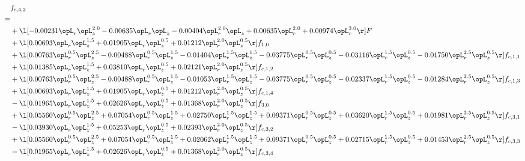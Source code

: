 \begin{alignat}{2} 
\label{eq:f_42_1} 
& f_{c,4,2} \nonumber \\ 
 = \\ 
& + \l[  -0.00231 \opL_r \opL_z^{2.0}   -0.00635 \opL_r \opL_z   -0.00404 \opL_r^{2.0} \opL_z +  0.00635 \opL_r^{2.0} +  0.00974 \opL_r^{3.0}  \r] F \nonumber \\ 
& + \l[  0.00693 \opL_r \opL_z^{1.5} +  0.01905 \opL_r \opL_z^{0.5} +  0.01212 \opL_r^{2.0} \opL_z^{0.5}  \r] f_{1,0} \nonumber \\ 
& + \l[  0.00763 \opL_r^{0.5} \opL_z^{2.5}   -0.00488 \opL_r^{0.5} \opL_z^{1.5}   -0.01404 \opL_r^{1.5} \opL_z^{1.5}   -0.03775 \opL_r^{0.5} \opL_z^{0.5}   -0.03116 \opL_r^{1.5} \opL_z^{0.5}   -0.01750 \opL_r^{2.5} \opL_z^{0.5}  \r] f_{c,1,1} \nonumber \\ 
& + \l[  0.01385 \opL_r \opL_z^{1.5} +  0.03810 \opL_r \opL_z^{0.5} +  0.02121 \opL_r^{2.0} \opL_z^{0.5}  \r] f_{c,1,2} \nonumber \\ 
& + \l[  0.00763 \opL_r^{0.5} \opL_z^{2.5}   -0.00488 \opL_r^{0.5} \opL_z^{1.5}   -0.01053 \opL_r^{1.5} \opL_z^{1.5}   -0.03775 \opL_r^{0.5} \opL_z^{0.5}   -0.02337 \opL_r^{1.5} \opL_z^{0.5}   -0.01284 \opL_r^{2.5} \opL_z^{0.5}  \r] f_{c,1,3} \nonumber \\ 
& + \l[  0.00693 \opL_r \opL_z^{1.5} +  0.01905 \opL_r \opL_z^{0.5} +  0.01212 \opL_r^{2.0} \opL_z^{0.5}  \r] f_{c,1,4} \nonumber \\ 
& - \l[  0.01965 \opL_r \opL_z^{1.5} +  0.02626 \opL_r \opL_z^{0.5} +  0.01368 \opL_r^{2.0} \opL_z^{0.5}  \r] f_{3,0} \nonumber \\ 
& + \l[  0.05560 \opL_r^{0.5} \opL_z^{2.5} +  0.07054 \opL_r^{0.5} \opL_z^{1.5} +  0.02750 \opL_r^{1.5} \opL_z^{1.5} +  0.09371 \opL_r^{0.5} \opL_z^{0.5} +  0.03620 \opL_r^{1.5} \opL_z^{0.5} +  0.01981 \opL_r^{2.5} \opL_z^{0.5}  \r] f_{c,3,1} \nonumber \\ 
& - \l[  0.03930 \opL_r \opL_z^{1.5} +  0.05253 \opL_r \opL_z^{0.5} +  0.02393 \opL_r^{2.0} \opL_z^{0.5}  \r] f_{c,3,2} \nonumber \\ 
& + \l[  0.05560 \opL_r^{0.5} \opL_z^{2.5} +  0.07054 \opL_r^{0.5} \opL_z^{1.5} +  0.02062 \opL_r^{1.5} \opL_z^{1.5} +  0.09371 \opL_r^{0.5} \opL_z^{0.5} +  0.02715 \opL_r^{1.5} \opL_z^{0.5} +  0.01453 \opL_r^{2.5} \opL_z^{0.5}  \r] f_{c,3,3} \nonumber \\ 
& - \l[  0.01965 \opL_r \opL_z^{1.5} +  0.02626 \opL_r \opL_z^{0.5} +  0.01368 \opL_r^{2.0} \opL_z^{0.5}  \r] f_{c,3,4} \nonumber \\ 

\end{alignat}
